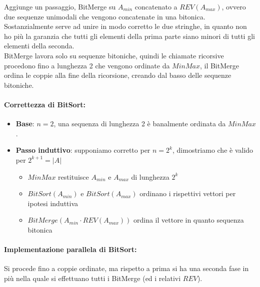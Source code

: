 Aggiunge un passaggio, BitMerge su $A_{min}$ concatenato a $REV(A_{max})$, ovvero due sequenze unimodali che vengono concatenate in una bitonica. Sostanzialmente serve ad unire in modo corretto le due stringhe, in quanto non ho più la garanzia che tutti gli elementi della prima parte siano minori di tutti gli elementi della seconda.\\

BitMerge lavora solo su sequenze bitoniche, quindi le chiamate ricorsive procedono fino a lunghezza 2 che vengono ordinate da $MinMax$, il BitMerge ordina le coppie alla fine della ricorsione, creando dal basso delle sequenze bitoniche.\\

\paragraph{Correttezza di BitSort:}
\begin{itemize}
	\item \textbf{Base}: $n=2$, una sequenza di lunghezza 2 è banalmente ordinata da $MinMax$.\\
	
	\item \textbf{Passo induttivo}: supponiamo corretto per $n=2^k$, dimostriamo che è valido per $2^{k+1} = |A|$
	\begin{itemize}
		\item $MinMax$ restituisce $A_{min}$ e $A_{max}$ di lunghezza $2^k$
		\item $BitSort (A_{min})$ e $BitSort (A_{max})$ ordinano i rispettivi vettori per ipotesi induttiva
		\item $BitMerge(A_{min} \cdot REV(A_{max}))$ ordina il vettore in quanto sequenza bitonica
	\end{itemize}
	\nn
\end{itemize} 

\newpage

\paragraph{Implementazione parallela di BitSort:} Si procede fino a coppie ordinate, ma rispetto a prima si ha una seconda fase in più nella quale si effettuano tutti i BitMerge (ed i relativi $REV$).\\

